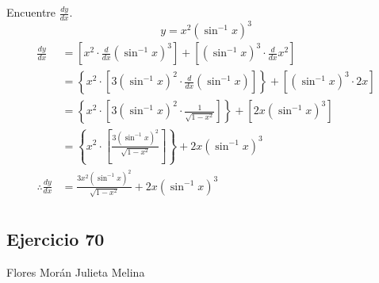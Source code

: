 \documentclass[12pt]{article}
\begin{document}
Encuentre $\frac{dy}{dx}$.
\[
y=x^2(\sin^{-1}{x})^3
\]
\begin{equation*}
  \begin{split}
    \frac{dy}{dx}
    &= \left[x^2\cdot \frac{d}{dx}(\sin^{-1}{x})^3 \right] + \left[(\sin^{-1}{x})^3\cdot \frac{d}{dx}x^2\right] \\
    &= \left\lbrace x^2\cdot \left[3(\sin^{-1}{x})^2\cdot \frac{d}{dx}(\sin^{-1}{x}) \right] \right\rbrace + \left[(\sin^{-1}{x})^3\cdot 2x\right] \\
    &= \left\lbrace x^2\cdot \left[3(\sin^{-1}{x})^2\cdot \frac{1}{\sqrt{1-x^2}} \right] \right\rbrace + \left[2x(\sin^{-1}{x})^3\right] \\
    &= \left\lbrace x^2\cdot \left[ \frac{3(\sin^{-1}{x})^2}{\sqrt{1-x^2}} \right] \right\rbrace + 2x(\sin^{-1}{x})^3 \\
    \therefore
    \frac{dy}{dx}
    &= \frac{3x^2(\sin^{-1}{x})^2}{\sqrt{1-x^2}} + 2x(\sin^{-1}{x})^3 \\
  \end{split}
\end{equation*}

\subsection{Ejercicio 70} Flores Morán Julieta Melina \\
\end{document}
